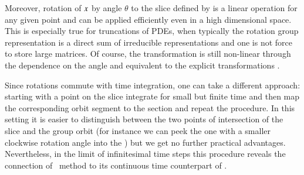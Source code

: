 Moreover, rotation of $x$ by angle $\theta$
to the slice defined by  is a linear operation
for any given point and can be applied efficiently
even in a high dimensional space. This is especially true
for truncations of PDEs, when typically the rotation group
representation is a direct sum of irreducible
representations and one is not force to store large matrices.
Of course, the transformation is still non-linear
through the dependence on the angle and equivalent to the
explicit transformations .


Since rotations commute with time integration, one can take a different approach:
starting with a point on the slice integrate for small but finite time and then map the
corresponding orbit segment to the section and repeat the procedure. In this setting it
is easier to distinguish between the two points of intersection of the slice and the group
orbit (for instance we can peek the one with a smaller clockwise rotation angle into the \slice)
but we get no further practical advantages. Nevertheless, in the limit of infinitesimal
time steps this procedure reveals the connection of \mframes\ method to
its continuous time counterpart of .

